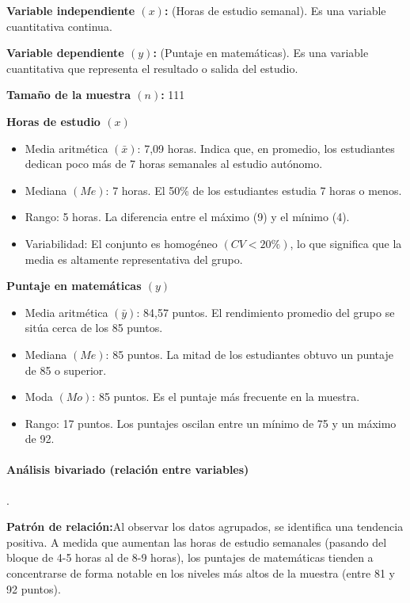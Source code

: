 \textbf{Variable independiente $(x)$:}  (Horas de estudio semanal). Es una variable cuantitativa continua.

\textbf{Variable dependiente $(y)$:}  (Puntaje en matemáticas). Es una variable cuantitativa que representa el resultado o salida del estudio.

\textbf{Tamaño de la muestra $(n)$:} 111

\textbf{Horas de estudio $(x)$}
\begin{itemize}
\item Media aritmética $(\bar{x})$: 7,09 horas. Indica que, en promedio, los estudiantes dedican poco más de 7 horas semanales al estudio autónomo.
\item Mediana $(Me)$: 7 horas. El 50\% de los estudiantes estudia 7 horas o menos.
\item Rango: 5 horas. La diferencia entre el máximo (9) y el mínimo (4).
\item Variabilidad: El conjunto es homogéneo $(CV<20\%)$, lo que significa que la media es altamente representativa del grupo.
\end{itemize}

\textbf{Puntaje en matemáticas $(y)$}
\begin{itemize}
\item Media aritmética $(\bar{y})$: 84,57 puntos. El rendimiento promedio del grupo se sitúa cerca de los 85 puntos.
\item Mediana $(Me)$: 85 puntos. La mitad de los estudiantes obtuvo un puntaje de 85 o superior.
\item Moda $(Mo)$: 85 puntos. Es el puntaje más frecuente en la muestra.
\item Rango: 17 puntos. Los puntajes oscilan entre un mínimo de 75 y un máximo de 92.
\end{itemize}
\newpage
\TablaDeDatos





\paragraph{Análisis bivariado (relación entre variables)}.

\textbf{Patrón de relación:}Al observar los datos agrupados, se identifica una tendencia positiva. A medida que aumentan las horas de estudio semanales (pasando del bloque de 4-5 horas al de 8-9 horas), los puntajes de matemáticas tienden a concentrarse de forma notable en los niveles más altos de la muestra (entre 81 y 92 puntos).

